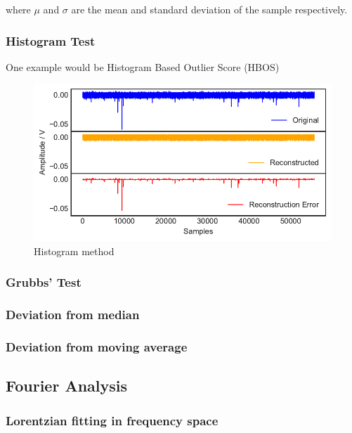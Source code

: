 where $\mu$ and $\sigma$ are the mean and standard deviation of the sample respectively.

\subsubsection{Histogram Test}

One example would be Histogram Based Outlier Score (HBOS)

\begin{figure}[t]
    \includegraphics[width=1.0\textwidth]{fig/histogram.pdf}
    \caption[Histogram]{Histogram method}
    \label{fig:histogram}
\end{figure}

\subsubsection{Grubbs' Test}

\subsubsection{Deviation from median}

\subsubsection{Deviation from moving average}

\subsection{Fourier Analysis}
\subsubsection{Lorentzian fitting in frequency space}

 \cite{IJIRD44249}


